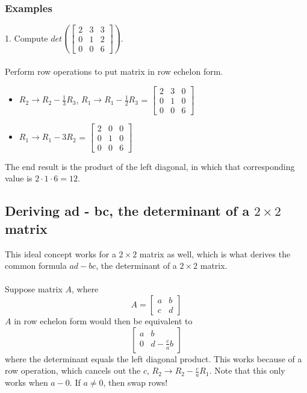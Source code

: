 \begin{enumerate}
\subsubsection{Examples}
1. Compute $det(\begin{bmatrix} 2 & 3 & 3 \\ 0 & 1 & 2 \\ 0 & 0 & 6 
\end{bmatrix})$.\\\\
Perform row operations to put matrix in row echelon form. 
\begin{itemize}
  \item $R_2 \rightarrow R_2 - \frac{1}{3}R_3$, $R_1 \rightarrow R_1 - \frac{1}{2}R_3$ =
    $\begin{bmatrix} 2 & 3 & 0 \\ 0 & 1 & 0 \\ 0 & 0 & 6 \end{bmatrix}$
  \item $R_1 \rightarrow R_1 - 3R_2$ 
    = $\begin{bmatrix} 2 & 0 & 0 \\ 0 & 1 & 0 \\ 0 & 0 & 6 \end{bmatrix}$
\end{itemize}
The end result is the product of the left diagonal, in which that 
corresponding value is $2 \cdot 1 \cdot 6 = 12$. 
\subsection{Deriving ad - bc, the determinant of a $2 \times 2$ matrix}
This ideal concept works for a $2 \times 2$ matrix as well, which is what derives the common formula $ad - bc$, the determinant of a $2 \times 2$ 
matrix. \\\\
Suppose matrix $A$, where 
\[
  A = \begin{bmatrix} a & b \\ c & d \end{bmatrix}
\]
$A$ in row echelon form would then be equivalent to 
\[
  \begin{bmatrix} a & b \\ 0 & d - \frac{c}{a}b \end{bmatrix}
\] where the determinant equals the left diagonal product. 
This works because of a row operation, which cancels out the $c$, 
$R_2 \rightarrow R_2 - \frac{c}{a}R_1$. Note that this only works when 
$a - 0$. If $a \neq 0$, then swap rows!

\end{enumerate}
